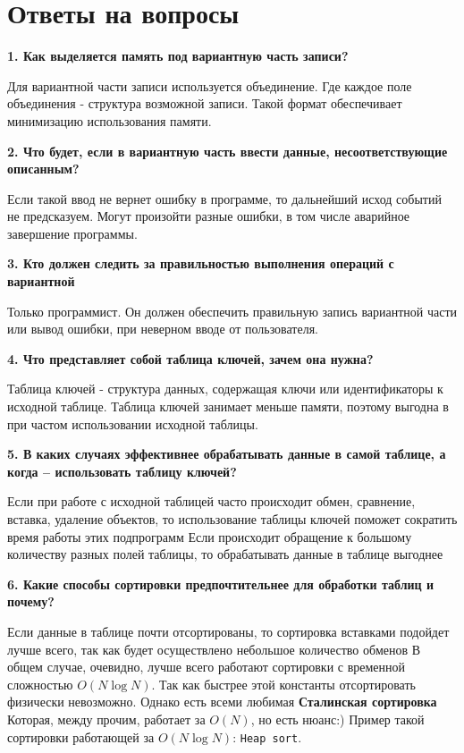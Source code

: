 \section{Ответы на вопросы}
\noindent\textbf{1. Как выделяется память под вариантную часть записи?}\par
Для вариантной части записи используется объединение. Где каждое поле объединения - структура возможной записи. Такой формат обеспечивает минимизацию использования памяти.\newline

\noindent\textbf{2. Что будет, если в вариантную часть ввести данные, несоответствующие
описанным?}\par
Если такой ввод не вернет ошибку в программе, то дальнейший исход событий не предсказуем. Могут произойти разные ошибки, в том числе аварийное завершение программы. \newline

\noindent\textbf{3. Кто должен следить за правильностью выполнения операций с вариантной}\par
Только программист. Он должен обеспечить правильную запись вариантной части или вывод ошибки, при неверном вводе от пользователя.\newline

\noindent\textbf{4. Что представляет собой таблица ключей, зачем она нужна?}\par
Таблица ключей - структура данных, содержащая ключи или идентификаторы к исходной таблице. Таблица ключей занимает меньше памяти, поэтому выгодна в при частом использовании исходной таблицы.\newline

\noindent\textbf{5. В каких случаях эффективнее обрабатывать данные в самой таблице, а когда –
	использовать таблицу ключей?}\par
Если при работе с исходной таблицей часто происходит обмен, сравнение, вставка, удаление объектов, то использование таблицы ключей поможет сократить время работы этих подпрограмм
Если происходит обращение к большому количеству разных полей таблицы, то обрабатывать данные в таблице выгоднее\newline

\noindent\textbf{6. Какие способы сортировки предпочтительнее для обработки таблиц и почему?}\par
Если данные в таблице почти отсортированы, то сортировка вставками подойдет лучше всего, так как будет осуществлено небольшое количество обменов
\newline
В общем случае, очевидно, лучше всего работают сортировки с временной сложностью $O(N \log N)$. Так как быстрее этой константы отсортировать физически невозможно. Однако есть всеми любимая \textbf{Сталинская сортировка} Которая, между прочим, работает за $O(N)$, но есть нюанс:)\newline 
Пример такой сортировки работающей за $O(N \log N)$: \texttt{Heap sort}.